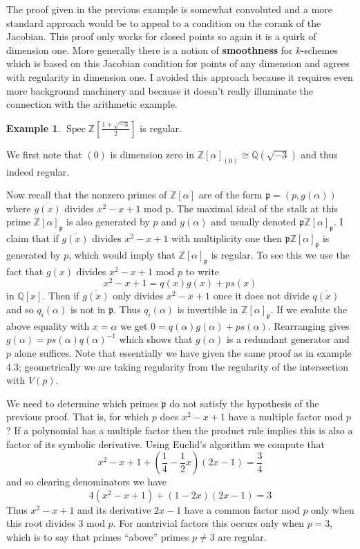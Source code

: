 \documentclass{article}
\DeclareMathOperator{\Spec}{Spec}
\newcommand{\p}{\ensuremath{\mathfrak{p}}}
\newcommand{\Z}{\ensuremath{\mathbb{Z}}}
\newcommand{\Q}{\ensuremath{\mathbb{Q}}}
\theoremstyle{definition}
\newcounter{dummy} \numberwithin{dummy}{section}
\newtheorem{example}[dummy]{Example}
\begin{document}
The proof given in the previous example is somewhat convoluted and a more standard approach would be to appeal to a condition on the corank of the Jacobian.
This proof only works for closed points so again it is a quirk of dimension one.
More generally there is a notion of \textbf{smoothness} for $k$-schemes which is based on this Jacobian condition for points of any dimension and agrees with regularity in dimension one.
I avoided this approach because it requires even more background machinery and because it doesn't really illuminate the connection with the arithmetic example.

\begin{example}
  $\Spec \Z\left[\frac{1+\sqrt{-3}}{2}\right]$ is regular.
\end{example}
\noindent
We first note that $(0)$ is dimension zero in $\Z[\alpha]_{(0)} \cong \Q(\sqrt{-3})$ and thus indeed regular.

Now recall that the nonzero primes of $\Z[\alpha]$ are of the form $\p = (p, g(\alpha))$ where $\overline{g(x)}$ divides $x^2-x+1$ mod p.
The maximal ideal of the stalk at this prime $\Z[\alpha]_\p$ is also generated by $p$ and $g(\alpha)$ and usually denoted $\p\Z[\alpha]_\p$.
I claim that if $\overline{g(x)}$ divides $x^2-x+1$ with multiplicity one then $\p\Z[\alpha]_\p$ is generated by $p$, which would imply that $\Z[\alpha]_\p$ is regular.
To see this we use the fact that $g(x)$ divides $x^2-x+1$  mod $p$ to write
$$x^2-x+1=q(x)g(x)+ps(x)$$
in $\Q[x]$.
Then if $\overline{g(x)}$ only divides $x^2-x+1$ once it does not divide $\overline{q(x)}$ and so $q_i(\alpha)$ is not in $\p$.
Thus $q_i(\alpha)$ is invertible in $\Z[\alpha]_\p$.
If we evalute the above equality with $x=\alpha$ we get
$0 = q(\alpha)g(\alpha) + p s(\alpha)$.
Rearranging gives $g(\alpha) = p s(\alpha) q(\alpha)^{-1}$ which shows that $g(\alpha)$ is a redundant generator and $p$ alone suffices.
Note that essentially we have given the same proof as in example 4.3; geometrically we are taking regularity from the regularity of the intersection with $V(p)$.

We need to determine which primes $\p$ do not satisfy the hypothesis of the previous proof.
That is, for which $p$ does $x^2-x+1$ have a multiple factor mod $p$?
If a polynomial has a multiple factor then the product rule implies this is also a factor of its symbolic derivative.
Using Euclid's algorithm we compute that
$$x^2-x+1 + \left(\frac14 - \frac12 x\right)(2x-1) = \frac{3}{4}$$
and so clearing denominators we have 
$$4(x^2-x+1)+ (1 -2x)(2x-1) = 3$$
Thus $x^2-x+1$ and its derivative $2x-1$ have a common factor mod $p$ only when this root divides $3$ mod $p$.
For nontrivial factors this occurs only when $p=3$, which is to say that primes ``above'' primes $p\neq 3$ are regular. 
\end{document}
